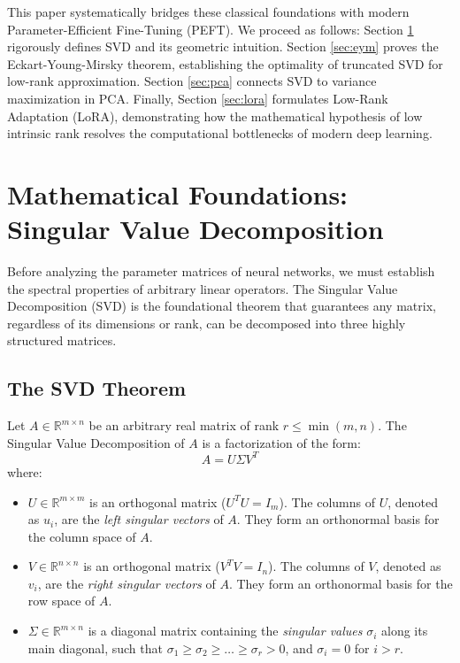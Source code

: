 \documentclass[11pt,journal,onecolumn]{IEEEtran}
\begin{document}
This paper systematically bridges these classical foundations with modern Parameter-Efficient Fine-Tuning (PEFT). We proceed as follows: Section \ref{sec:svd} rigorously defines SVD and its geometric intuition. Section \ref{sec:eym} proves the Eckart-Young-Mirsky theorem, establishing the optimality of truncated SVD for low-rank approximation. Section \ref{sec:pca} connects SVD to variance maximization in PCA. Finally, Section \ref{sec:lora} formulates Low-Rank Adaptation (LoRA), demonstrating how the mathematical hypothesis of low intrinsic rank resolves the computational bottlenecks of modern deep learning.

\section{Mathematical Foundations: Singular Value Decomposition}
\label{sec:svd}

Before analyzing the parameter matrices of neural networks, we must establish the spectral properties of arbitrary linear operators. The Singular Value Decomposition (SVD) is the foundational theorem that guarantees any matrix, regardless of its dimensions or rank, can be decomposed into three highly structured matrices.

\subsection{The SVD Theorem}
Let $A \in \mathbb{R}^{m \times n}$ be an arbitrary real matrix of rank $r \leq \min(m, n)$. The Singular Value Decomposition of $A$ is a factorization of the form:
\begin{equation}
A = U \Sigma V^T
\end{equation}
where:
\begin{itemize}
    \item $U \in \mathbb{R}^{m \times m}$ is an orthogonal matrix ($U^T U = I_m$). The columns of $U$, denoted as $u_i$, are the \textit{left singular vectors} of $A$. They form an orthonormal basis for the column space of $A$.
    \item $V \in \mathbb{R}^{n \times n}$ is an orthogonal matrix ($V^T V = I_n$). The columns of $V$, denoted as $v_i$, are the \textit{right singular vectors} of $A$. They form an orthonormal basis for the row space of $A$.
    \item $\Sigma \in \mathbb{R}^{m \times n}$ is a diagonal matrix containing the \textit{singular values} $\sigma_i$ along its main diagonal, such that $\sigma_1 \geq \sigma_2 \geq \dots \geq \sigma_r > 0$, and $\sigma_i = 0$ for $i > r$.
\end{itemize}
\end{document}
